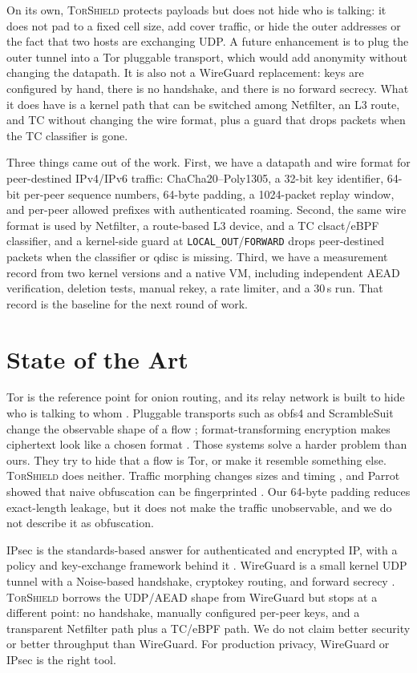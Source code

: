 \documentclass[conference]{IEEEtran}
\newcommand{\sys}{\textsc{TorShield}}
\newcommand{\code}[1]{\texttt{#1}}
\begin{document}
On its own, \sys{} protects payloads but does not hide who is talking: it does not pad to a fixed cell size, add cover traffic, or hide the outer addresses or the fact that two hosts are exchanging UDP. A future enhancement is to plug the outer tunnel into a Tor pluggable transport, which would add anonymity without changing the datapath. It is also not a WireGuard replacement: keys are configured by hand, there is no handshake, and there is no forward secrecy. What it does have is a kernel path that can be switched among Netfilter, an L3 route, and TC without changing the wire format, plus a guard that drops packets when the TC classifier is gone.

Three things came out of the work. First, we have a datapath and wire format for peer-destined IPv4/IPv6 traffic: ChaCha20--Poly1305, a 32-bit key identifier, 64-bit per-peer sequence numbers, 64-byte padding, a 1024-packet replay window, and per-peer allowed prefixes with authenticated roaming. Second, the same wire format is used by Netfilter, a route-based L3 device, and a TC clsact/eBPF classifier, and a kernel-side guard at \code{LOCAL\_OUT}/\code{FORWARD} drops peer-destined packets when the classifier or qdisc is missing. Third, we have a measurement record from two kernel versions and a native VM, including independent AEAD verification, deletion tests, manual rekey, a rate limiter, and a 30\,s run. That record is the baseline for the next round of work.

\section{State of the Art}
Tor is the reference point for onion routing, and its relay network is built to hide who is talking to whom \cite{dingledine2004tor}. Pluggable transports such as obfs4 and ScrambleSuit change the observable shape of a flow \cite{obfs4,winter2013scramblesuit}; format-transforming encryption makes ciphertext look like a chosen format \cite{dyer2013fte}. Those systems solve a harder problem than ours. They try to hide that a flow is Tor, or make it resemble something else. \sys{} does neither. Traffic morphing changes sizes and timing \cite{wright2009morphing}, and Parrot showed that naive obfuscation can be fingerprinted \cite{houmansadr2013parrot}. Our 64-byte padding reduces exact-length leakage, but it does not make the traffic unobservable, and we do not describe it as obfuscation.

IPsec is the standards-based answer for authenticated and encrypted IP, with a policy and key-exchange framework behind it \cite{kent2005ipsec}. WireGuard is a small kernel UDP tunnel with a Noise-based handshake, cryptokey routing, and forward secrecy \cite{donenfeld2017wireguard}. \sys{} borrows the UDP/AEAD shape from WireGuard but stops at a different point: no handshake, manually configured per-peer keys, and a transparent Netfilter path plus a TC/eBPF path. We do not claim better security or better throughput than WireGuard. For production privacy, WireGuard or IPsec is the right tool.
\end{document}
